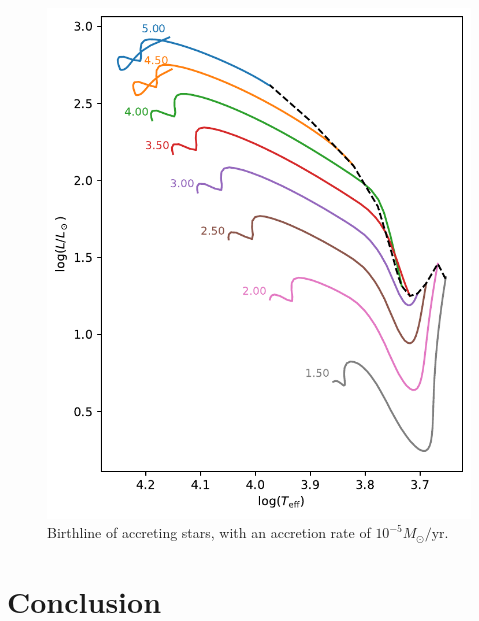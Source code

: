 \documentclass[12pt,a4paper]{article}
\newcommand{\mr}{\mathrm}
\begin{document}
\begin{figure}
  \centering  
  \includegraphics[width=.65\textwidth,keepaspectratio]{birthline_acce5.pdf}
  \caption{Birthline of accreting stars, with an accretion rate of $10^{-5} M_\odot/\mr{yr}$.} \label{fig:birthline_acce5}
\end{figure}




\section{Conclusion}
\label{sec:conclusion}
\end{document}
